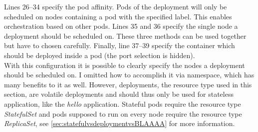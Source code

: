 Lines 26--34 specify the pod affinity. Pods of the deployment will only be scheduled on nodes containing a pod with the specified label. This enables orchestration based on other pods. Lines 35 and 36 specify the single node a deployment should be scheduled on. These three methods can be used together but have to chosen carefully. Finally, line 37--39 specify the container which should be deployed inside a pod (the port selection is hidden).\\
With this configuration it is possible to clearly specify the nodes a deployment should be scheduled on. I omitted how to accomplish it via namespace, which has many benefits to it as well. However, deployments, the resource type used in this section, are volatile deployments and should thus only be used for stateless application, like the \textit{hello} application. Stateful pods require the resource type \textit{StatefulSet} and pods supposed to run on every node require the resource type \textit{ReplicaSet}, see \cref{sec:statefulvsdeploymentvsBLAAAA} for more information.
